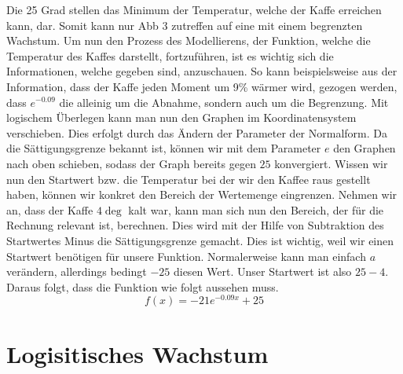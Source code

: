 Die 25 Grad stellen das Minimum der Temperatur, welche der Kaffe erreichen kann, dar. Somit kann nur Abb 3 zutreffen auf eine mit einem begrenzten Wachstum. Um nun den Prozess des Modellierens, der Funktion, welche die Temperatur des Kaffes darstellt, fortzuführen, ist es wichtig sich die Informationen, welche gegeben sind, anzuschauen. So kann beispielsweise aus der Information, dass der Kaffe jeden Moment um 9\% wärmer wird, gezogen werden, dass $e^{-0.09}$ die alleinig um die Abnahme, sondern auch um die Begrenzung. Mit logischem Überlegen kann man nun den Graphen im Koordinatensystem verschieben. Dies erfolgt durch das Ändern der Parameter der Normalform. Da die Sättigungsgrenze bekannt ist, können wir mit dem Parameter $e$ den Graphen nach oben schieben, sodass der Graph bereits gegen $25$ konvergiert. Wissen wir nun den Startwert bzw. die Temperatur bei der wir den Kaffee raus gestellt haben, können wir konkret den Bereich der Wertemenge eingrenzen. Nehmen wir an, dass der Kaffe $4\deg$ kalt war, kann man sich nun den Bereich, der für die Rechnung relevant ist, berechnen. Dies wird mit der Hilfe von Subtraktion des Startwertes Minus die Sättigungsgrenze gemacht. Dies ist wichtig, weil wir einen Startwert benötigen für unsere Funktion. Normalerweise kann man einfach $a$ verändern, allerdings bedingt $-25$ diesen Wert. Unser Startwert ist also $25-4$. Daraus folgt, dass die Funktion wie folgt aussehen muss. \[f(x)=-21e^{-0.09x}+25\]
\section{Logisitisches Wachstum}



